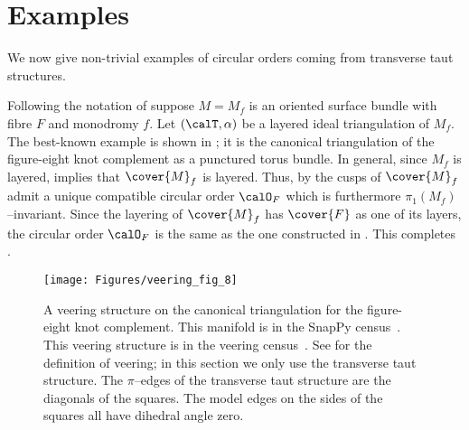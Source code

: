 \documentclass[12pt]{amsart}
\begin{document}
\section{Examples}
\label{Sec:Examples}

We now give non-trivial examples of circular orders coming from transverse taut structures.

\begin{example}
\label{Exa:SurfaceBundlesTwo}
Following the notation of  suppose $M = M_f$ is an oriented surface bundle with fibre $F$ and monodromy $f$.  Let $(\calT, \alpha)$ be a layered ideal triangulation of $M_f$.  The best-known example is shown in ; it is the canonical triangulation of the figure-eight knot complement as a punctured torus bundle.  In general, since $M_f$ is layered,  implies that $\cover{M}_f$ is layered.  Thus, by  the cusps of $\cover{M}_f$ admit a unique compatible circular order $\calO_F$ which is furthermore $\pi_1(M_f)$--invariant.  Since the layering of $\cover{M}_f$ has $\cover{F}$ as one of its layers, the circular order $\calO_F$ is the same as the one constructed in .  This completes . 
\end{example}

\begin{figure}[htbp]
\texttt{[image: Figures/veering\_fig\_8]}
\caption{A veering structure on the canonical triangulation for the figure-eight knot complement.  This manifold is \usebox{\FigEightSnappy} in the SnapPy census~\cite{snappy}.  This veering structure is \usebox{\FigEightVeer} in the veering census~\cite{GSS19}.  See  for the definition of veering; in this section we only use the transverse taut structure.  The $\pi$--edges of the transverse taut structure are the diagonals of the squares.  The model edges on the sides of the squares all have dihedral angle zero.}
\label{Fig:VeerFigEight}
\end{figure}
\end{document}
